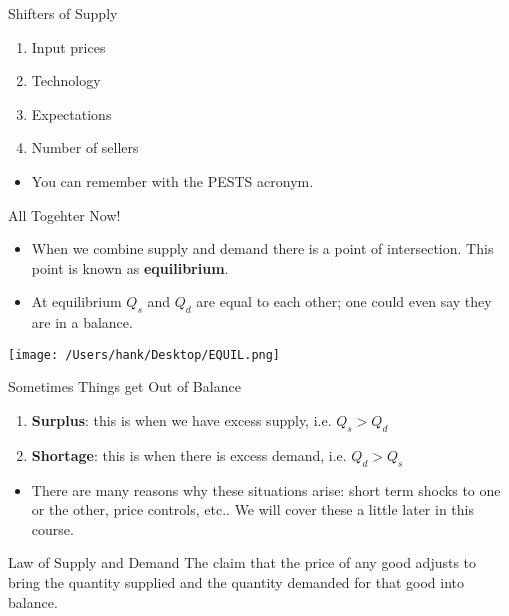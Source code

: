 \documentclass{beamer}
\begin{document}
\begin{frame}{Shifters of Supply}
    \begin{enumerate}
        \item<1-> Input prices
        \item<2-> Technology
        \item<3-> Expectations
        \item<4-> Number of sellers
    \end{enumerate}
    \vspace{5mm}
    \begin{itemize}
        \item<5-> You can remember with the PESTS acronym.
    \end{itemize}
\end{frame}

\begin{frame}{All Togehter Now!}
    \begin{itemize}
        \item When we combine supply and demand there is a point of intersection. This point is known as \textbf{equilibrium}.
        \item At equilibrium $Q_s$ and $Q_d$ are equal to each other; one could even say they are in a balance.
    \end{itemize}
    \begin{center}
        \texttt{[image: /Users/hank/Desktop/EQUIL.png]}
    \end{center}
\end{frame}

\begin{frame}{Sometimes Things get Out of Balance}
    \begin{enumerate}
        \item \textbf{Surplus}: this is when we have excess supply, i.e. $Q_s > Q_d$
        \item \textbf{Shortage}: this is when there is excess demand, i.e. $Q_d > Q_s$
    \end{enumerate}
    \begin{itemize}
    \vspace{5mm}
        \item There are many reasons why these situations arise: short term shocks to one or the other, price controls, etc.. We will cover these a little later in this course.
    \end{itemize}
    \vspace{5mm}
    \begin{block}{Law of Supply and Demand}
    The claim that the price of any good adjusts to bring the quantity supplied and the quantity demanded for that good into balance.
    \end{block}

\end{frame}
\end{document}

